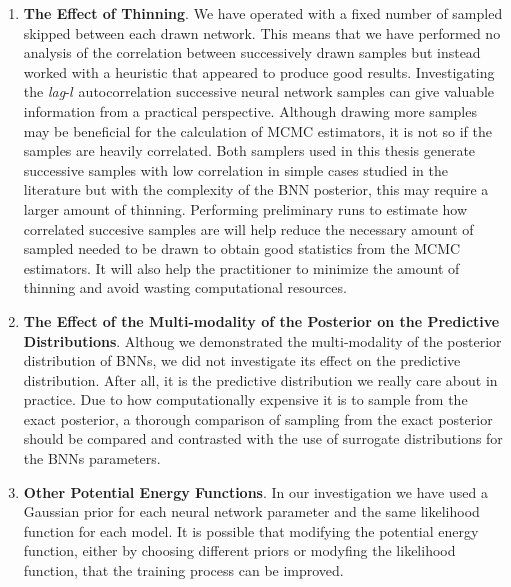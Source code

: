 \begin{enumerate}
    \item \textbf{The Effect of Thinning}. We have operated with a fixed number of sampled skipped between each drawn network. This means that we have performed no analysis of the correlation between successively drawn samples but instead worked with a heuristic that appeared to produce good results. Investigating the \textit{lag}-$l$ autocorrelation successive neural network samples can give valuable information from a practical perspective. Although drawing more samples may be beneficial for the calculation of MCMC estimators, it is not so if the samples are heavily correlated. Both samplers used in this thesis generate successive samples with low correlation in simple cases studied in the literature \cite{nuts,neal2011} but with the complexity of the BNN posterior, this may require a larger amount of thinning. Performing preliminary runs to estimate how correlated succesive samples are will help reduce the necessary amount of sampled needed to be drawn to obtain good statistics from the MCMC estimators. It will also help the practitioner to minimize the amount of thinning and avoid wasting computational resources.
    \item \textbf{The Effect of the Multi-modality of the Posterior on the Predictive Distributions}. Althoug we demonstrated the multi-modality of the posterior distribution of BNNs, we did not investigate its effect on the predictive distribution. After all, it is the predictive distribution we really care about in practice. Due to how computationally expensive it is to sample from the exact posterior, a thorough comparison of sampling from the exact posterior should be compared and contrasted with the use of surrogate distributions for the BNNs parameters. 
    \item \textbf{Other Potential Energy Functions}. In our investigation we have used a Gaussian prior for each neural network parameter and the same likelihood function for each model. It is possible that modifying the potential energy function, either by choosing different priors or modyfing the likelihood function, that the training process can be improved.
\end{enumerate}